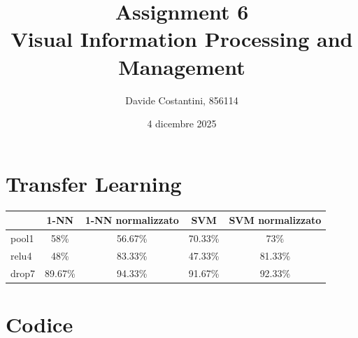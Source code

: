 \documentclass[a4paper]{article}
\title{
	Assignment 6 \\
	\large Visual Information Processing and Management}
\author{Davide Costantini, 856114}
\date{4 dicembre 2025}
\begin{document}
	\maketitle
	\newpage
	\section{Transfer Learning}
    \begin{table}[H]
        \begin{center}
            \begin{tabular}{l|c|c|c|c}
                        & \textbf{1-NN} & \textbf{1-NN normalizzato} & \textbf{SVM} & \textbf{SVM normalizzato} \\
                \hline
                pool1   & 58\%          & 56.67\%                    & 70.33\%      & 73\%                      \\
                relu4   & 48\%          & 83.33\%                    & 47.33\%      & 81.33\%                   \\
                drop7   & 89.67\%       & 94.33\%                    & 91.67\%      & 92.33\%                   \\
            \end{tabular}
        \end{center}
    \end{table}
	\section{Codice}
    
\end{document}
